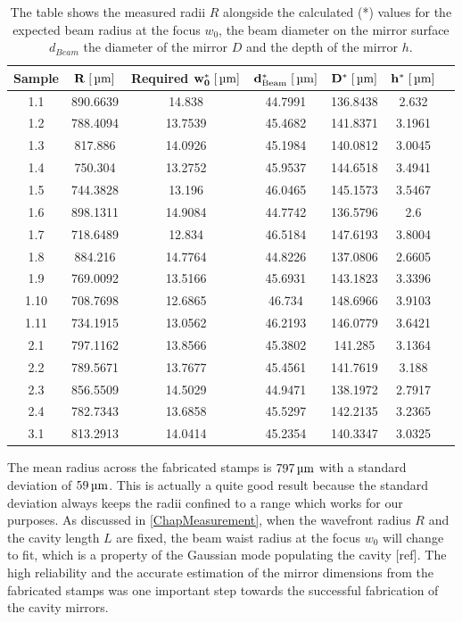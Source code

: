 \begin{table}[H]
	\begin{tabular}{ccccccc}
	\hline
\textbf{Sample} & \textbf{$\mathbf{R\;[\um]}$} & \textbf{Required $\mathbf{w_0^*\;[\um]}$} & \textbf{$\mathbf{d_{\si{Beam}}^*\;[\um]}$} & \textbf{$\mathbf{D^*\;[\um]}$} & \textbf{$\mathbf{h^*\;[\um]}$} \\
	\hline
	1.1 & 890.6639 & 14.838 & 44.7991 & 136.8438 & 2.632 \\
	1.2 & 788.4094 & 13.7539 & 45.4682 & 141.8371 & 3.1961 \\
	1.3 & 817.886 & 14.0926 & 45.1984 & 140.0812 & 3.0045 \\
	1.4 & 750.304 & 13.2752 & 45.9537 & 144.6518 & 3.4941 \\
	1.5 & 744.3828 & 13.196 & 46.0465 & 145.1573 & 3.5467 \\
	1.6 & 898.1311 & 14.9084 & 44.7742 & 136.5796 & 2.6 \\
	1.7 & 718.6489 & 12.834 & 46.5184 & 147.6193 & 3.8004 \\
	1.8 & 884.216 & 14.7764 & 44.8226 & 137.0806 & 2.6605 \\
	1.9 & 769.0092 & 13.5166 & 45.6931 & 143.1823 & 3.3396 \\
	1.10 & 708.7698 & 12.6865 & 46.734 & 148.6966 & 3.9103 \\
	1.11 & 734.1915 & 13.0562 & 46.2193 & 146.0779 & 3.6421 \\
	2.1 & 797.1162 & 13.8566 & 45.3802 & 141.285 & 3.1364 \\
	2.2 & 789.5671 & 13.7677 & 45.4561 & 141.7619 & 3.188 \\
	2.3 & 856.5509 & 14.5029 & 44.9471 & 138.1972 & 2.7917 \\
	2.4 & 782.7343 & 13.6858 & 45.5297 & 142.2135 & 3.2365 \\
	3.1 & 813.2913 & 14.0414 & 45.2354 & 140.3347 & 3.0325 \\
	\hline
\end{tabular}
	\caption{The table shows the measured radii $R$ alongside the calculated (*) values for the expected beam radius at the focus $w_0$, the beam diameter on the mirror surface $d_{\si{Beam}}$ the diameter of the mirror $D$ and the depth of the mirror $h$.}
	\label{table:CalcMirrorData}
\end{table}
The mean radius across the fabricated stamps is $797\um$ with a standard deviation of $59\um$. This is actually a quite good result because the standard deviation always keeps the radii confined to a range which works for our purposes. As discussed in \autoref{ChapMeasurement}, when the wavefront radius $R$ and the cavity length $L$ are fixed, the beam waist radius at the focus $w_0$ will change to fit, which is a property of the Gaussian mode populating the cavity [ref]. The high reliability and the accurate estimation of the mirror dimensions from the fabricated stamps was one important step towards the successful fabrication of the cavity mirrors.


